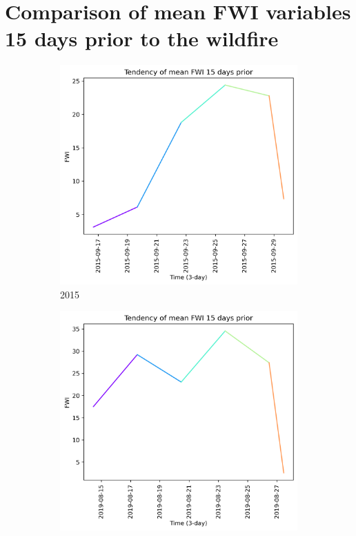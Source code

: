 \FloatBarrier

\section{Comparison of mean FWI variables 15 days prior to the wildfire}

\begin{figure}[h]
    \centering
    \caption{FWI values 15 days prior to wildfire}
    \begin{subfigure}{0.3\textwidth}
        \centering
        \includegraphics[width=\textwidth]{graphs/15days/2015_15daysprior_tendency_graph_FWI.png}
        \caption{2015}
        \label{fig:prior_15_days_2015}
    \end{subfigure}
    \hfill
    \begin{subfigure}{0.3\textwidth}
        \centering
        \includegraphics[width=\textwidth]{graphs/15days/2019_15daysprior_tendency_graph_FWI.png}

\end{subfigure}
\end{figure}
